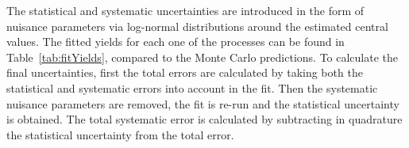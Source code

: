 The statistical and systematic uncertainties are introduced in the form of
nuisance parameters via log-normal distributions around the estimated central values.
The fitted yields for each one of the processes can be found in Table~\ref{tab:fitYields}, 
compared to the Monte Carlo predictions.
To calculate the final uncertainties, first the          
total errors are calculated by taking both
the statistical and systematic errors into
account in the fit. Then the systematic nuisance parameters are removed, the fit is re-run
and the statistical uncertainty is 
obtained. The total systematic error is calculated by subtracting in quadrature 
the statistical uncertainty from the total error.



